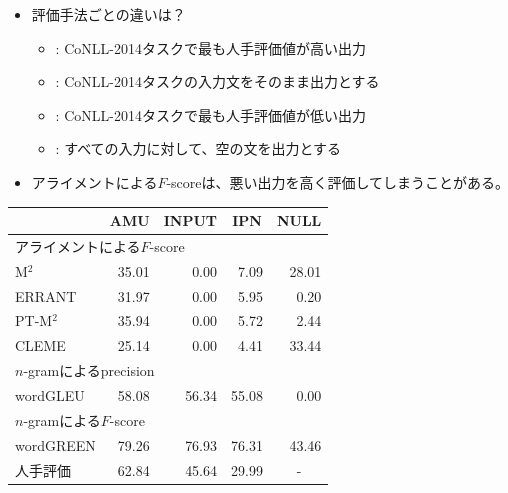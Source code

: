 \documentclass[11pt]{beamer}
\newenvironment{backblock}{%
		\begin{tcolorbox}[ 
			enhanced,
			fonttitle=\bfseries,
			colframe=gray,
			colback=gray!5!,
			colbacktitle=gray!80,
			attach boxed title to top left={yshift=-2mm, xshift=2mm}]
			\vskip2mm
			}{%
		\end{tcolorbox}
		}
\begin{document}
\begin{frame}[t]
\begin{columns}[t]
\begin{column}{.50\linewidth}
						\begin{backblock}
							\begin{itemize}
								\item 評価手法ごとの違いは？
									\begin{itemize}
										\item {}: CoNLL-2014タスクで最も人手評価値が高い出力
										\item {}: CoNLL-2014タスクの入力文をそのまま出力とする
										\item {}: CoNLL-2014タスクで最も人手評価値が低い出力
										\item {}: すべての入力に対して、空の文を出力とする
									\end{itemize}
								\item アライメントによる$F$-scoreは、悪い出力を高く評価してしまうことがある。
							\end{itemize}
							\begin{table}[t]
								\centering
								\begin{tabular}{lrrrr}
									\hline
									& \multicolumn{1}{c}{AMU} & \multicolumn{1}{c}{INPUT} & \multicolumn{1}{c}{IPN} & \multicolumn{1}{c}{NULL} \\
									\hline
									\multicolumn{5}{l}{アライメントによる$F$-score} \\
									M${}^2$ & 35.01 & 0.00 & 7.09 & 28.01 \\
									ERRANT & 31.97 & 0.00 & 5.95 & 0.20 \\
									PT-M${}^2$ & 35.94 & 0.00 & 5.72 & 2.44 \\
									CLEME & 25.14 & 0.00 & 4.41 & 33.44 \\
									\hline
									\multicolumn{5}{l}{$n$-gramによるprecision} \\
									wordGLEU & 58.08 & 56.34 & 55.08 & 0.00 \\
									\hline
									\multicolumn{5}{l}{$n$-gramによる$F$-score} \\
									wordGREEN & 79.26 & 76.93 & 76.31 & 43.46 \\
									\hline
									人手評価 & 62.84 & 45.64 & 29.99 & \multicolumn{1}{c}{-} \\
									\hline
								\end{tabular}
							\end{table}
						\end{backblock}
					\end{column}
				\end{columns}
			\end{frame}
		
\end{document}
